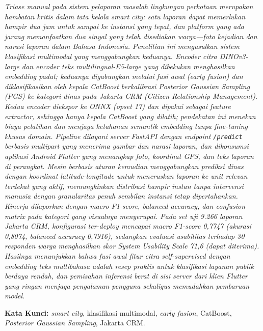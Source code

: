 {\selectfont\itshape{}
\noindent Triase manual pada sistem pelaporan masalah lingkungan perkotaan merupakan hambatan kritis dalam tata kelola \textit{smart city}: satu laporan dapat memerlukan hampir dua jam untuk sampai ke instansi yang tepat, dan platform yang ada jarang memanfaatkan dua sinyal yang telah disediakan warga---foto kejadian dan narasi laporan dalam Bahasa Indonesia. Penelitian ini mengusulkan sistem klasifikasi multimodal yang menggabungkan keduanya. \textit{Encoder} citra DINOv3-\textit{large} dan \textit{encoder} teks \textit{multilingual}-E5-\textit{large} yang dibekukan menghasilkan \textit{embedding} padat; keduanya digabungkan melalui fusi awal (\textit{early fusion}) dan diklasifikasikan oleh kepala CatBoost berkalibrasi \textit{Posterior Gaussian Sampling} (PGS) ke kategori dinas pada Jakarta CRM (\textit{Citizen Relationship Management}). Kedua \textit{encoder} diekspor ke ONNX (\textit{opset} 17) dan dipakai sebagai \textit{feature extractor}, sehingga hanya kepala CatBoost yang dilatih; pendekatan ini menekan biaya pelatihan dan menjaga ketahanan semantik \textit{embedding} tanpa \textit{fine-tuning} khusus domain. \textit{Pipeline} dilayani server FastAPI dengan \textit{endpoint} \texttt{/predict} berbasis \textit{multipart} yang menerima gambar dan narasi laporan, dan dikonsumsi aplikasi Android Flutter yang menangkap foto, koordinat GPS, dan teks laporan di perangkat. Mesin berbasis aturan kemudian menggabungkan prediksi dinas dengan koordinat \textit{latitude-longitude} untuk meneruskan laporan ke unit relevan terdekat yang aktif, memungkinkan distribusi hampir instan tanpa intervensi manusia dengan granularitas penuh sembilan instansi tetap dipertahankan. Kinerja dilaporkan dengan \textit{macro F1-score}, \textit{balanced accuracy}, dan \textit{confusion matrix} pada kategori yang visualnya menyerupai. Pada set uji 9.266 laporan Jakarta CRM, konfigurasi ter-\textit{deploy} mencapai \textit{macro F1-score} 0,7747 (akurasi 0,8074, \textit{balanced accuracy} 0,7916), sedangkan evaluasi usabilitas terhadap 30 responden warga menghasilkan skor \textit{System Usability Scale} 71,6 (dapat diterima). Hasilnya menunjukkan bahwa fusi awal fitur citra \textit{self-supervised} dengan \textit{embedding} teks multibahasa adalah resep praktis untuk klasifikasi layanan publik berdaya rendah, dan pemisahan inferensi berat di sisi server dari klien Flutter yang ringan menjaga pengalaman pengguna sekaligus memudahkan pembaruan model.

\noindent\textbf{Kata Kunci:} \textit{smart city}, klasifikasi multimodal, \textit{early fusion}, CatBoost, \textit{Posterior Gaussian Sampling}, Jakarta CRM.
}

\newpage
